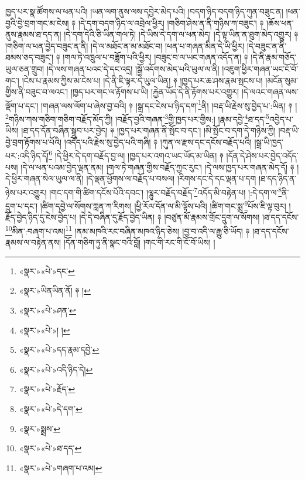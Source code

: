 ཁྱད་པར་སྣ་ཚོགས་ལ་ཕན་པའི། །ཡན་ལག་ནུས་ལས་དབྱེར་མེད་པའི། །བདག་ཉིད་བདག་ཉིད་ཀུན་བཟུང་ན། །ཕན་བྱའི་བྱེ་བྲག་གང་མ་ངེས། ༈ །དེ་དག་བདག་ཉིད་ལ་འབྲེལ་ཕྱིར། །གཅིག་ཤེས་ན་ནི་གཉིས་ཀ་བཟུང་། ༈ །ཆོས་ཕན་ནུས་རྣམས་ཐ་དད་ན། །དེ་དག་དེའི་ཅི་ཡིན་གལ་ཏེ། །དེ་ཡིས་དེ་དག་ལ་ཕན་མེད། །དེ་ལྟ་ཡིན་ན་ཐུག་མེད་འགྱུར། ༈ །གཅིག་ལ་ཕན་བྱེད་བཟུང་ན་ནི། །དེ་ལ་མཐོང་ན་མ་མཐོང་བ། །ཕན་པ་གཞན་མིན་དེ་ཡི་ཕྱིར། །དེ་བཟུང་ན་ནི་ཐམས་ཅད་བཟུང་། ༈ །གལ་ཏེ་འཁྲུལ་པ་བཟློག་པའི་ཕྱིར། །བཟུང་བ་ལ་ཡང་གཞན་འདོད་ན། ༈ །དེ་ནི་རྣམ་གཅོད་ཡུལ་ཅན་གྲུབ། །དེ་ལས་གཞན་པའང་དེ་དང་འདྲ། །སྒྲོ་འདོགས་མེད་པའི་ཡུལ་ལ་ནི། །འཇུག་ཕྱིར་གཞན་ཡང་ངོ་བོ་གང་། །ངེས་པ་རྣམས་ཀྱིས་མ་ངེས་པ། །དེ་ནི་ཇི་ལྟར་དེ་ཡུལ་ཡིན། ༈ །ཁྱད་པར་ཆ་ཤས་རྣམ་སྤངས་པ། །མངོན་སུམ་གྱིས་ནི་བཟུང་བ་ལའང་། །ཁྱད་པར་གང་ལ་རྟོགས་པ་ཡི། །རྐྱེན་ཡོད་དེ་ནི་རྟོགས་པར་འགྱུར། །དེ་ལའང་གཞན་ལས་ལྡོག་པ་དང་། །གཞན་ལས་ལོག་པ་ཞེས་བྱ་བའི། ༈ །སྒྲ་དང་ངེས་པ་ཉིད་དག་\footnote{«སྣར་»«པེ་»དང་}ནི། །བརྡ་ཡི་རྗེས་སུ་བྱེད་པ་:ཡིན། ༈ །\footnote{«སྣར་»ཡིནཡིན་ནོ། ༈ །}གཉིས་ཀས་གཅིག་གཅིག་བརྗོད་མོད་ཀྱི། །བརྗོད་བྱའི་གཞན་\footnote{«སྣར་»«པེ་»ཤན་}གྱི་ཁྱད་པར་གྱིས:། །རྣམ་དབྱེ་\footnote{«སྣར་»«པེ་»། །}ཐ་དད་\footnote{«སྣར་»«པེ་»དད་རྣམ་དབྱེ་}འབྱེད་པ་ཡིས། །ཐ་དད་དོན་བཞིན་སྒྲུབ་པར་བྱེད། ༈ །ཁྱད་པར་གཞན་ནི་སྤོང་བ་དང་། །མི་སྤོང་བ་དག་དེ་གཉིས་ཀྱི། །བརྡ་ཡི་བྱེ་བྲག་རྟོགས་པ་པོའི། །འདོད་པའི་རྗེས་སུ་བྱེད་པའི་གཞི། ༈ །ཀུན་ལ་རྫས་དང་དངོས་བརྗོད་པའི། །སྒྲ་ཡི་ཁྱད་པར་:འདི་ཉིད་དོ།\footnote{«སྣར་»«པེ་»འདི་ཉིད་དེ།} །དེ་ཕྱིར་དེ་དག་བརྗོད་བྱ་ལ། །ཁྱད་པར་འགའ་ཡང་ཡོད་མ་ཡིན། ༈ །དོན་དེ་ཤེས་པར་བྱེད་འདོད་པས། །དེ་ལ་ཕན་པའམ་བྱེད་ལྡན་ནམ། །གལ་ཏེ་གཞན་གྱིས་བརྗོད་ཀྱང་རུང་། །དེ་ལས་ཁྱད་པར་གཞན་མེད་དོ། ༈ །དེ་ཕྱིར་གཞན་སེལ་ཡུལ་ལ་ནི། །དེ་ལྡན་ཕྱོགས་ལ་བརྗོད་པ་བསལ། །རིགས་དང་དེ་དང་ལྡན་པ་དག །ཐ་དད་ཉིད་ན་ཉེས་པར་འགྱུར། །གང་དག་གི་ཚིག་དངོས་པོའི་དབང་། །ལྷུར་བརྗོད་བརྗོད་\footnote{«སྣར་»«པེ་»རྗོད་}འདོད་མི་བརྟེན་པ། །:དེ་དག་ལ་\footnote{«སྣར་»«པེ་»དེ་དག་}ནི་དྲུག་པ་དང་། །ཚིག་དབྱེ་ལ་སོགས་ཀླན་ཀ་རིགས། །ཕྱི་རོལ་དོན་ལ་མི་ལྟོས་པའི། །ཚིག་གང་སྨྲ་\footnote{«སྣར་»སྨྲས་}པོས་ཇི་ལྟ་བུར། །རྗོད་བྱེད་ཉིད་དུ་ངེས་བྱེད་པ། །དེ་དེ་བཞིན་དུ་རྗོད་བྱེད་ཡིན། ༈ །བཙུན་མོ་རྣམས་གྲོང་དྲུག་ལ་སོགས། །ཐ་དད་དངོས་\footnote{«སྣར་»«པེ་»ཐ་དད་}མིན་:བཞག་པ་འམ།\footnote{«སྣར་»«པེ་»གཞག་པ་འམ།} །ནམ་མཁའི་རང་བཞིན་མཁའ་ཉིད་ཅེས། །བྱ་བ་འདི་ལ་རྒྱུ་ཅི་ཡོད། ༈ །ཐ་དད་དངོས་རྣམས་ལ་བརྟེན་ནས། །དོན་གཅིག་ཏུ་ནི་སྣང་བའི་བློ། །གང་གི་རང་གི་ངོ་བོ་ཡིས། །
